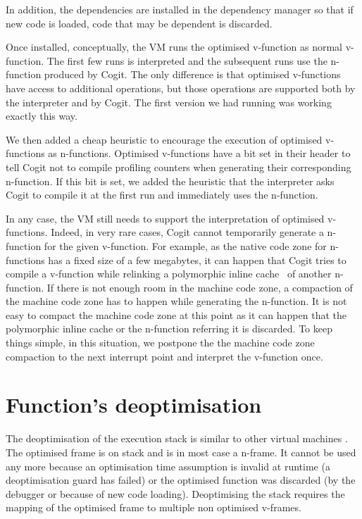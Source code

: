 \documentclass[a4paper,12pt,twoside]{../includes/ThesisStyle}
\begin{document}
In addition, the dependencies are installed in the dependency manager so that if new code is loaded, code that may be dependent is discarded.

Once installed, conceptually, the VM runs the optimised v-function as normal v-function. The first few runs is interpreted and the subsequent runs use the n-function produced by Cogit. The only difference is that optimised v-functions have access to additional operations, but those operations are supported both by the interpreter and by Cogit. The first version we had running was working exactly this way.

We then added a cheap heuristic to encourage the execution of optimised v-functions as n-functions. Optimised v-functions have a bit set in their header to tell Cogit not to compile profiling counters when generating their corresponding n-function. If this bit is set, we added the heuristic that the interpreter asks Cogit to compile it at the first run and immediately uses the n-function. 

In any case, the VM still needs to support the interpretation of optimised v-functions. Indeed, in very rare cases, Cogit cannot temporarily generate a n-function for the given v-function. For example, as the native code zone for n-functions has a fixed size of a few megabytes, it can happen that Cogit tries to compile a v-function while relinking a polymorphic inline cache~\cite{Holz91a} of another n-function. If there is not enough room in the machine code zone, a compaction of the machine code zone has to happen while generating the n-function. It is not easy to compact the machine code zone at this point as it can happen that the polymorphic inline cache or the n-function referring it is discarded. To keep things simple, in this situation, we postpone the the machine code zone compaction to the next interrupt point and interpret the v-function once.


\section {Function's deoptimisation}

The deoptimisation of the execution stack is similar to other virtual machines \cite{Fin03a, Holz92a}. The optimised frame is on stack and is in most case a n-frame. It cannot be used any more because an optimisation time assumption is invalid at runtime (a deoptimisation guard has failed) or the optimised function was discarded (by the debugger or because of new code loading). Deoptimising the stack requires the mapping of the optimised frame to multiple non optimised v-frames. 
\end{document}
